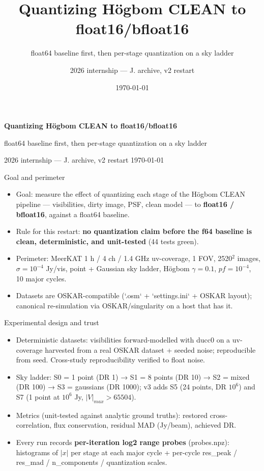 \documentclass[aspectratio=169,10pt]{beamer}
\title[Low-precision CLEAN]{Quantizing Högbom CLEAN to float16/bfloat16}
\subtitle{float64 baseline first, then per-stage quantization on a sky ladder}
\author{2026 internship — J. archive, v2 restart}
\date{\today}
\begin{document}
\begin{frame}[plain]
\centering
{\LARGE\bfseries Quantizing Högbom CLEAN to float16/bfloat16\par}
\vspace{0.6em}
{\normalsize float64 baseline first, then per-stage quantization on a sky ladder\par}
\vspace{3em}
{\normalsize 2026 internship — J. archive, v2 restart \hspace{3em} \today\par}
\end{frame}

\begin{frame}{Goal and perimeter}
\begin{itemize}
\item Goal: measure the effect of quantizing each stage of the Högbom CLEAN
  pipeline — visibilities, dirty image, PSF, clean model — to
  \textbf{float16 / bfloat16}, against a float64 baseline.
\item Rule for this restart: \textbf{no quantization claim before the f64
  baseline is clean, deterministic, and unit-tested} (44 tests green).
\item Perimeter: MeerKAT 1 h / 4 ch / 1.4 GHz uv-coverage, 1\textdegree{} FOV,
  2520$^2$ images, $\sigma=10^{-4}$ Jy/vis, point + Gaussian sky ladder,
  Högbom $\gamma=0.1$, $pf=10^{-4}$, 10 major cycles.
\item Datasets are OSKAR-compatible (`.osm` + `settings.ini` + OSKAR layout);
  canonical re-simulation via OSKAR/singularity on a host that has it.
\end{itemize}
\end{frame}

\begin{frame}{Experimental design and trust}
\begin{itemize}
\item Deterministic datasets: visibilities forward-modelled with ducc0 on a
  uv-coverage harvested from a real OSKAR dataset + seeded noise; reproducible
  from seed. Cross-study reproducibility verified to float noise.
\item Sky ladder: S0 = 1 point (DR 1) → S1 = 8 points (DR 10) → S2 = mixed
  (DR 100) → S3 = gaussians (DR 1000); v3 adds S5 (24 points, DR $10^6$) and
  S7 (1 point at $10^6$ Jy, $|V|_{max} > 65504$).
\item Metrics (unit-tested against analytic ground truths): restored
  cross-correlation, flux conservation, residual MAD (Jy/beam), achieved DR.
\item Every run records \textbf{per-iteration log2 range probes} (probes.npz):
  histograms of $|x|$ per stage at each major cycle + per-cycle
  res\_peak / res\_mad / n\_components / quantization scales.
\end{itemize}
\end{frame}
\end{document}
